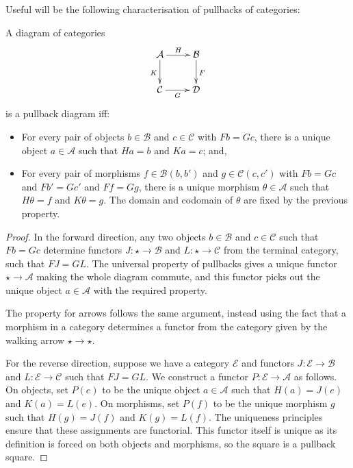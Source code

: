 Useful will be the following characterisation of pullbacks of categories:
\begin{lemma}
\label{lem:pullbacks-in-cat}
A diagram of categories
\[ \xymatrix{
    \mathcal{A} \ar[r]^-{H} \ar[d]_K & \mathcal{B} \ar[d]^F \\
    \mathcal{C} \ar[r]_-{G} & \mathcal{D}
  }\]
is a pullback diagram iff:
\begin{itemize}
\item For every pair of objects $b \in \mathcal{B}$ and $c \in \mathcal{C}$ with $Fb = Gc$, there is a unique object $a \in \mathcal{A}$ such that $Ha = b$ and $Ka = c$; and,
\item For every pair of morphisms $f \in \mathcal{B}(b,b')$ and $g \in   \mathcal{C}(c,c')$ with $F b = G c$ and $F b' = G c'$ and $Ff= Gg$,   there is a unique morphism $\theta \in \mathcal{A}$ such that $H\theta   = f$ and $K\theta = g$. The domain and codomain of $\theta$ are fixed   by the previous property.
\end{itemize}
\end{lemma}
\begin{proof}
In the forward direction, any two objects $b \in \mathcal{B}$ and $c \in \mathcal{C}$ such that $Fb = Gc$ determine functors $J : \star \to \mathcal{B}$ and $L : \star \to \mathcal{C}$ from the terminal category, such that $FJ = GL$. The universal property of pullbacks gives a unique functor $\star \to \mathcal{A}$ making the whole diagram commute, and this functor picks out the unique object $a \in \mathcal{A}$ with the required property. 

The property for arrows follows the same argument, instead using the fact that a morphism in a category determines a functor from the category given by the walking arrow $\star \to \star$.

For the reverse direction, suppose we have a category $\mathcal{E}$ and functors $J : \mathcal{E} \to \mathcal{B}$ and $L : \mathcal{E} \to \mathcal{C}$ such that $FJ = GL$. We construct a functor $P : \mathcal{E} \to \mathcal{A}$ as follows. On objects, set $P(e)$ to be the unique object $a \in \mathcal{A}$ such that $H(a) = J(e)$ and $K(a) = L(e)$. On morphisms, set $P(f)$ to be the unique morphism $g$ such that $H(g) = J(f)$ and $K(g) = L(f)$. The uniqueness principles ensure that these assignments are functorial. This functor itself is unique as its definition is forced on both objects and morphisms, so the square is a pullback square.
\end{proof}

